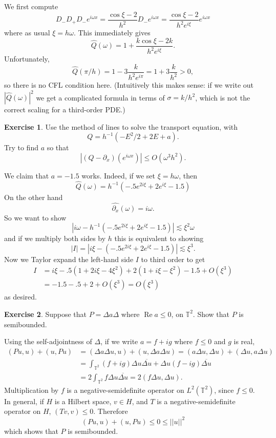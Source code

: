 \documentclass[10pt]{article}
\newcommand{\Torus}{\mathbb T}
\renewcommand{\Re}{\operatorname{Re}}
\theoremstyle{definition}
\newtheorem{exer}{Exercise}
\begin{document}
We first compute
$$D_- D_+ D_- e^{i\omega x} = \frac{\cos \xi - 2}{h^2} D_- e^{i\omega x} = \frac{\cos \xi - 2}{h^2e^{i\xi}} e^{i\omega x}$$
where as usual $\xi = h\omega$.
This immediately gives
$$\hat Q(\omega) = 1 + \frac{k \cos \xi - 2k}{h^2 e^{i\xi}}.$$
Unfortunately,
$$\hat Q(\pi/h) = 1 - 3 \frac{k}{h^2e^{i\pi}} = 1 + 3\frac{k}{h^2} > 0,$$
so there is no CFL condition here.
(Intuitively this makes sense: if we write out $|\hat Q(\omega)|^2$ we get a complicated formula in terms of $\sigma = k/h^2$, which is not the correct scaling for a third-order PDE.)

\begin{exer}
Use the method of lines to solve the transport equation, with
$$Q = h^{-1}(-E^2/2 + 2E + a).$$
Try to find $a$ so that
$$|(Q - \partial_x)(e^{i\omega x})| \leq O(\omega^3 h^2).$$
\end{exer}

We claim that $a = -1.5$ works. Indeed, if we set $\xi = h\omega$, then
$$\hat Q(\omega) = h^{-1}(-.5e^{2i\xi} + 2e^{i\xi} - 1.5)$$
On the other hand
$$\widehat{\partial_x}(\omega) = i\omega.$$
So we want to show
$$|i\omega - h^{-1}(-.5e^{2i\xi} + 2e^{i\xi} - 1.5)| \lesssim \xi^2 \omega$$
and if we multiply both sides by $h$ this is equivalent to showing
$$|I| = |i\xi - (-.5e^{2i\xi} + 2e^{i\xi} - 1.5)| \lesssim \xi^3.$$
Now we Taylor expand the left-hand side $I$ to third order to get
\begin{align*}I &= i\xi - .5(1 + 2i\xi - 4\xi^2) + 2(1 + i\xi - \xi^2) - 1.5 + O(\xi^3) \\
&= -1.5 - .5 + 2 + O(\xi^3) = O(\xi^3)
\end{align*}
as desired.

\begin{exer}
Suppose that $P = \Delta a \Delta$ where $\Re a \leq 0$, on $\Torus^2$. Show that $P$ is semibounded.
\end{exer}

Using the self-adjointness of $\Delta$, if we write $a = f + ig$ where $f \leq 0$ and $g$ is real,
\begin{align*}
(Pu, u) + (u, Pu) &= (\Delta a \Delta u, u) + (u, \Delta a \Delta u) = (a \Delta u, \Delta u) + (\Delta u, a \Delta u)\\
&= \int_{\Torus^2} (f + ig) \Delta u \overline{\Delta u} + \Delta u (f - ig) \overline{\Delta u} \\
&= 2\int_{\Torus^2} f \Delta u \overline{\Delta u} = 2(f \Delta u, \Delta u).
\end{align*}
Multiplication by $f$ is a negative-semidefinite operator on $L^2(\Torus^2)$, since $f \leq 0$.
In general, if $H$ is a Hilbert space, $v \in H$, and $T$ is a negative-semidefinite operator on $H$, $(Tv, v) \leq 0$.
Therefore
$$(Pu, u) + (u, Pu) \leq 0 \leq ||u||^2$$
which shows that $P$ is semibounded.
\end{document}
